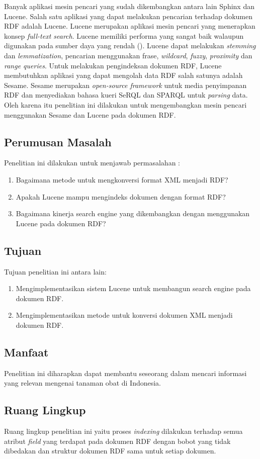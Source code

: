 Banyak aplikasi mesin pencari yang sudah dikembangkan antara lain Sphinx dan Lucene. Salah satu aplikasi yang dapat melakukan pencarian terhadap dokumen RDF adalah Lucene. Lucene merupakan aplikasi mesin pencari yang menerapkan konsep \textit{full-text search}. Lucene memiliki performa yang sangat baik walaupun digunakan pada sumber daya yang rendah (\cite{MINACK}). Lucene dapat melakukan \textit{stemming} dan \textit{lemmatization}, pencarian menggunakan frase, \textit{wildcard}, \textit{fuzzy}, \textit{proximity} dan \textit{range queries}. Untuk melakukan pengindeksan dokumen RDF, Lucene membutuhkan aplikasi yang dapat mengolah data RDF salah satunya adalah Sesame. Sesame merupakan \textit{open-source framework} untuk media penyimpanan RDF dan menyediakan bahasa kueri SeRQL dan SPARQL untuk \textit{parsing} data. Oleh karena itu penelitian ini dilakukan untuk mengembangkan mesin pencari menggunakan Sesame dan Lucene pada dokumen RDF.

\subsection*{Perumusan Masalah}
Penelitian ini dilakukan untuk menjawab permasalahan :
\begin{enumerate}[noitemsep] 
\item Bagaimana metode untuk mengkonversi format XML menjadi RDF?
\item Apakah Lucene mampu mengindeks dokumen dengan format RDF?
\item Bagaimana kinerja search engine yang dikembangkan dengan menggunakan Lucene pada dokumen RDF?
\end{enumerate}

\subsection*{Tujuan}
Tujuan penelitian ini antara lain:
\begin{enumerate}[noitemsep] 
\item Mengimplementasikan sistem Lucene untuk membangun search engine pada dokumen RDF.
\item Mengimplementasikan metode untuk konversi dokumen XML menjadi dokumen RDF.
\end{enumerate}

\subsection*{Manfaat}
Penelitian ini diharapkan dapat membantu seseorang dalam mencari informasi yang relevan mengenai tanaman obat di Indonesia.

\subsection*{Ruang Lingkup}
Ruang lingkup penelitian ini yaitu proses \textit{indexing} dilakukan terhadap semua atribut \textit{field} yang terdapat pada dokumen RDF dengan bobot yang tidak dibedakan dan struktur dokumen RDF sama untuk setiap dokumen.
